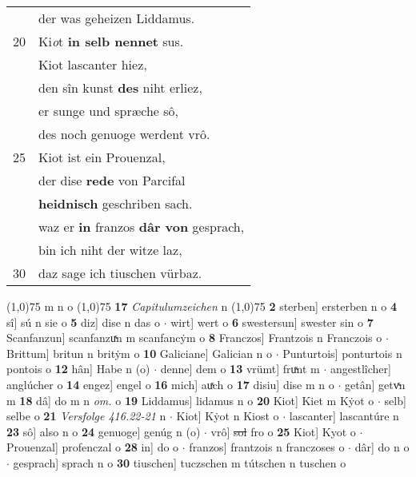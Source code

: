 \documentclass[8pt,a4paper,notitlepage]{article}
\begin{document}
\begin{table}[ht]
\begin{minipage}[t]{0.5\linewidth}
\begin{tabular}{rl}
 & der was geheizen Liddamus.\\ 
20 & Ki\textit{o}t \textbf{in selb nennet} sus.\\ 
 & Kiot lascanter hiez,\\ 
 & den sîn kunst \textbf{des} niht erliez,\\ 
 & er sunge und spræche sô,\\ 
 & des noch genuoge werdent vrô.\\ 
25 & Kiot ist ein Prouenzal,\\ 
 & der dise \textbf{rede} von Parcifal\\ 
 & \textbf{heidnisch} geschriben sach.\\ 
 & waz er \textbf{in} franzos \textbf{dâr von} gesprach,\\ 
 & bin ich niht der witze laz,\\ 
30 & daz sage ich tiuschen vürbaz.\\ 
\end{tabular}
\scriptsize
\line(1,0){75} \newline
m n o \newline
\line(1,0){75} \newline
\textbf{17} \textit{Capitulumzeichen} n  \newline
\line(1,0){75} \newline
\textbf{2} sterben] ersterben n o \textbf{4} sî] sú n sie o \textbf{5} diz] dise n das o  $\cdot$ wirt] wert o \textbf{6} swestersun] swester sin o \textbf{7} Scanfanzun] scanfanzuͯn m scanfancẏm o \textbf{8} Franczos] Frantzois n Franczois o  $\cdot$ Brittum] britun n britẏm o \textbf{10} Galiciane] Galician n o  $\cdot$ Punturtois] ponturtois n pontois o \textbf{12} hân] Habe n (o)  $\cdot$ denne] dem o \textbf{13} vrümt] fruͯnt m  $\cdot$ angestlîcher] anglúcher o \textbf{14} engez] engel o \textbf{16} mich] auͯch o \textbf{17} disiu] dise m n o  $\cdot$ getân] getvͯn m \textbf{18} dâ] do m n \textit{om.} o \textbf{19} Liddamus] lidamus n o \textbf{20} Kiot] Kiet m Kẏot o  $\cdot$ selb] selbe o \textbf{21} \textit{Versfolge 416.22-21} n   $\cdot$ Kiot] Kẏot n Kiost o  $\cdot$ lascanter] lascantúre n \textbf{23} sô] also n o \textbf{24} genuoge] genúg n (o)  $\cdot$ vrô] \sout{sol} fro o \textbf{25} Kiot] Kyot o  $\cdot$ Prouenzal] profenczal o \textbf{28} in] do o  $\cdot$ franzos] frantzois n franczoses o  $\cdot$ dâr] do n o  $\cdot$ gesprach] sprach n o \textbf{30} tiuschen] tuczschen m tútschen n tuschen o \newline
\end{minipage}
\end{table}
\end{document}

